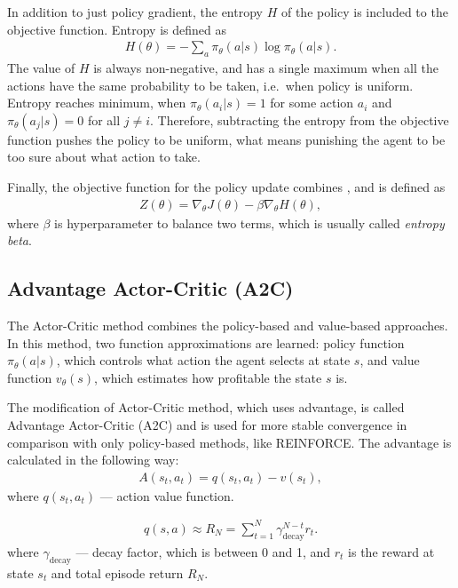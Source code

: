 \documentclass{article}
\begin{document}
In addition to just policy gradient, the entropy $H$ of the policy is included
to the objective function. Entropy is defined as
\begin{align}
  \label{eq:entropy}
  H(\theta) = - \sum_a \pi_{\theta}(a | s) \log \pi_{\theta}(a | s).
\end{align}
The value of $H$ is always non-negative, and has a single maximum
when all the actions have the same probability to be taken, i.e.\ when
policy is uniform. Entropy reaches minimum, when
$\pi_{\theta}(a_i | s) = 1$ for some action $a_i$ and
$\pi_{\theta}(a_j | s) = 0$ for all $j \neq i$. Therefore,
subtracting the entropy from the objective function pushes the policy to be uniform,
what means punishing the agent to be too sure about what action to take.

Finally, the objective function for the policy update combines
, and is defined as
\begin{align}
  \label{eq:rnf_objective}
  Z(\theta) = \nabla_\theta J(\theta) - \beta \nabla_\theta H(\theta),
\end{align}
where $\beta$ is hyperparameter to balance two terms, which is usually
called \textit{entropy beta}.

\subsection{Advantage Actor-Critic (A2C)}\label{subsubsec:a2c}

The Actor-Critic method combines the policy-based and value-based approaches.
In this method, two function approximations are learned: policy function
$\pi_{\theta}(a|s)$, which controls what action the agent selects at state $s$,
and value function $v_{\theta}(s)$, which estimates how profitable the state
$s$ is.

The modification of Actor-Critic method, which uses advantage, is called
Advantage Actor-Critic (A2C) and is used for more stable convergence in
comparison with only policy-based methods, like REINFORCE. The advantage is
calculated in the following way:
\begin{align*}
  A(s_t, a_t) = q(s_t,a_t)- v(s_t),
\end{align*}
where $ q(s_t,a_t)$ --- action value function.

\begin{align}\label{eq:q_estimation}
  q(s,a) \approx R_N = \sum_{t=1}^N \gamma^{N-t}_\text{decay} r_t.
\end{align}
where $\gamma_\text{decay}$ --- decay factor, which is between 0 and 1,
and $r_t$ is the reward at state $s_t$ and total episode return $R_N$.
\end{document}
